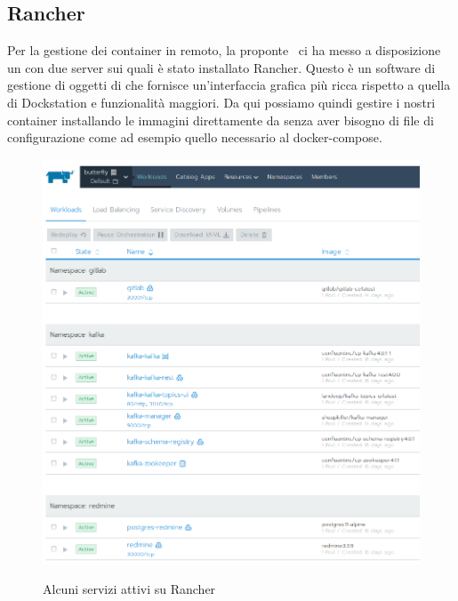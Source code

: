         \subsection{Rancher}
    	Per la gestione dei container in remoto, la proponte \II~ci ha messo a disposizione un  con due server sui quali è stato installato Rancher. Questo è un software di gestione di oggetti di  che fornisce un'interfaccia grafica più ricca rispetto a quella di Dockstation e funzionalità maggiori.
    	Da qui possiamo quindi gestire i nostri container installando le immagini direttamente da  senza aver bisogno di file di configurazione come ad esempio quello necessario al docker-compose.
    	
    	\begin{figure}[H]
    		\centering
    		\includegraphics[width=.7\textwidth]{img/rancher.png}\\
    		\caption{Alcuni servizi attivi su Rancher}
    		\label{fig:rancher}
    	\end{figure}
        
			